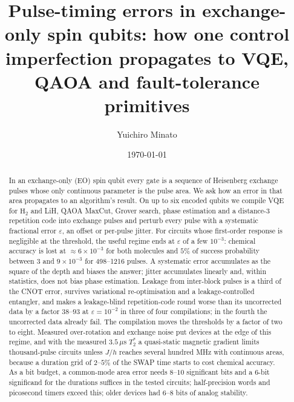 \documentclass[reprint,aps,pra,amsmath,amssymb,superscriptaddress,letterpaper]{revtex4-2}
\newcommand{\Hz}{\mathrm{H}_2}
\begin{document}
\title{Pulse-timing errors in exchange-only spin qubits: how one control imperfection propagates to VQE, QAOA and fault-tolerance primitives}

\author{Yuichiro Minato}

\date{\today}

\begin{abstract}
In an exchange-only (EO) spin qubit every gate is a sequence of Heisenberg
exchange pulses whose only continuous parameter is the pulse area. We ask how an error in that area propagates to an algorithm's result. On up to six encoded qubits we compile VQE for $\Hz$ and LiH, QAOA
MaxCut, Grover search, phase estimation and a distance-3 repetition code into
exchange pulses and perturb every pulse with a systematic fractional error
$\varepsilon$, an offset or per-pulse jitter. For circuits whose first-order response is negligible at the threshold, the useful regime ends at
$\varepsilon$ of a few $10^{-3}$: chemical accuracy is lost at
$\approx6\times10^{-3}$ for both molecules and $5\%$ of success probability between $3$ and $9\times10^{-3}$ for 498--1216 pulses. A systematic error
accumulates as the square of the depth and biases the answer; jitter accumulates linearly and, within statistics, does not bias phase estimation. Leakage from inter-block pulses is a
third of the CNOT error, survives variational re-optimisation and a leakage-controlled entangler, and makes a leakage-blind repetition-code round worse than its uncorrected data by a factor $38$--$93$ at $\varepsilon=10^{-2}$ in three of four compilations; in the fourth the uncorrected data already fail. The compilation moves the thresholds by a factor of two to eight. Measured over-rotation and exchange noise put devices at the edge of this regime, and with the measured $3.5\,\mu$s $T_2^*$ a quasi-static magnetic gradient limits thousand-pulse circuits unless $J/h$ reaches several hundred MHz with continuous areas, because a duration grid of $2$--$5\%$ of the SWAP time starts to cost chemical accuracy. As a bit budget, a common-mode area error needs $8$--$10$ significant bits and a $6$-bit significand for the durations suffices in the tested circuits; half-precision words and picosecond timers exceed this; older devices had $6$--$8$ bits of analog stability.
\end{abstract}

\maketitle
\end{document}
